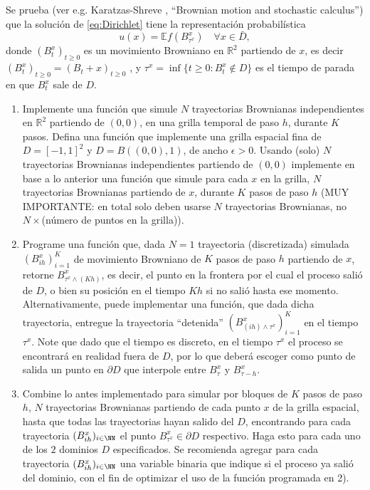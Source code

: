 Se prueba (ver e.g. Karatzas-Shreve , ``Brownian motion and stochastic calculus'')  que la solución de \eqref{eq:Dirichlet} tiene la  representaci\'on probabilística 
\begin{equation}
\label{eq:u}
u(x) = \mathbb{E} f(B^x_{\tau^x}) \quad \forall x\in \bar{D},
\end{equation}
donde $(B^x_t)_{t\geq 0}$ es un movimiento Browniano en $\mathbb{R}^2$ partiendo de $x$,  es decir $(B^x_t)_{t\geq 0} = (B_t+x)_{t\geq 0}$ , y  $\tau^x = \inf\{t\geq 0: B^x_t \notin D\}$ es el tiempo de parada en que $B^x_t$  sale de $D$. 
\begin{enumerate}
\item Implemente una funci\'on que simule $N$ trayectorias Brownianas independientes en $\mathbb{R}^2$ partiendo de $(0,0)$, en una grilla temporal de paso $h$, durante $K$ pasos. Defina una  funci\'on que implemente una grilla espacial fina de $D=[-1,1]^2$ y $D=B((0,0), 1)$, de ancho $\epsilon>0$. Usando (solo) $N$ trayectorias  Brownianas  independientes partiendo  de $(0,0)$    implemente en base a lo anterior una funci\'on que  simule  para cada $x$ en la grilla, $N$  trayectorias Brownianas partiendo de  $x$, durante $K$ pasos  de paso $h$ (MUY IMPORTANTE:  en total solo deben usarse $N$ trayectorias Brownianas, no $N\times $(n\'umero de puntos en la grilla)). 

\item Programe una funci\'on que, dada $N=1$ trayectoria (discretizada)  simulada  $(B^x_{ih})_{i=1}^K$ de movimiento Browniano de $K$ pasos de paso $h$ partiendo de $x$, retorne $B^x_{\tau^x \wedge (Kh)}$, es decir,  el punto  en la frontera por el cual el proceso sali\'o  de $D$, o bien su posici\'on en el tiempo $Kh$ si no sali\'o hasta ese momento.  Alternativamente, puede implementar una funci\'on, que dada dicha trayectoria, entregue la trayectoria ``detenida''   $(B^x_{(ih) \wedge \tau^x})_{i=1}^K$ en el tiempo  $\tau^x$.   Note que dado que el tiempo es discreto, en el tiempo $\tau^x$ el proceso se encontrar\'a en realidad fuera de $D$,  por lo que deber\'a  escoger  como punto de salida  un punto  en $\partial D$ que interpole entre $B^x_{\tau}$ y $B^x_{\tau-h}$. 

 \item Combine lo antes implementado para simular por bloques de $K$ pasos de paso $h$,  $N$ trayectorias Brownianas partiendo de cada punto $x$ de la grilla espacial, hasta que todas las trayectorias hayan salido del $D$, encontrando para cada  trayectoria $(B^x_{ih})_{i\in \NN}$ el punto $B^x_{\tau^x} \in \partial D$ respectivo.   Haga esto para cada uno de los $2$ dominios $D$ especificados.  Se recomienda agregar para cada trayectoria   $(B^x_{ih})_{i\in \NN}$    una variable binaria que indique si el proceso ya sali\'o del  dominio, con el fin de optimizar  el uso de la funci\'on programada en 2). 
  

\end{enumerate}
